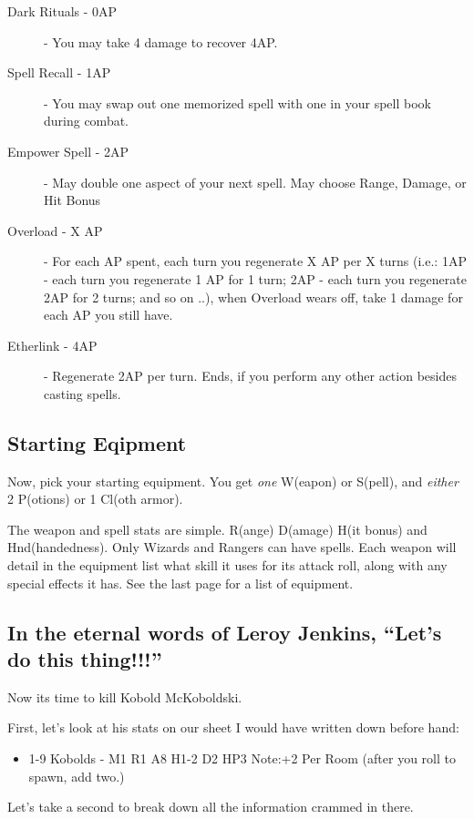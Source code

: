 \documentclass[a6paper,hidelinks]{article}
\begin{document}
\begin{description}

\item[Dark Rituals - 0AP] - You may take 4 damage to recover 4AP.
\item[Spell Recall - 1AP] - You may swap out one memorized spell with one in your spell book during combat.
\item[Empower Spell - 2AP] - May double one aspect of your next spell. May choose Range, Damage, or Hit Bonus
\item[Overload - X AP] - For each AP spent, each turn you regenerate X AP per X turns (i.e.: 1AP - each turn you regenerate 1 AP for 1 turn; 2AP - each turn you regenerate 2AP for 2 turns; and so on ..), when Overload wears off, take 1 damage for each AP you still have.
\item[Etherlink - 4AP] - Regenerate 2AP per turn. Ends, if you perform any other action besides casting spells.

\end{description}

\subsection{Starting Eqipment}
Now, pick your starting equipment. You get {\em one} W(eapon) or S(pell), and {\em either} 2 P(otions) or 1 Cl(oth armor).

The weapon and spell stats are simple. R(ange) D(amage) H(it bonus) and Hnd(handedness). Only Wizards and Rangers can have spells. Each weapon will detail in the equipment list what skill it uses for its attack roll, along with any special effects it has. See the last page for a list of equipment.

\subsection{In the eternal words of Leroy Jenkins, ``Let's do this thing!!!''}

Now its time to kill Kobold McKoboldski.

First, let’s look at his stats on our sheet I would have written down before hand:
\begin{itemize}
\item 1-9 Kobolds - M1 R1 A8 H1-2 D2 HP3 Note:+2 Per Room (after you roll to spawn, add two.)
\end{itemize}

Let's take a second to break down all the information crammed in there.
\end{document}
